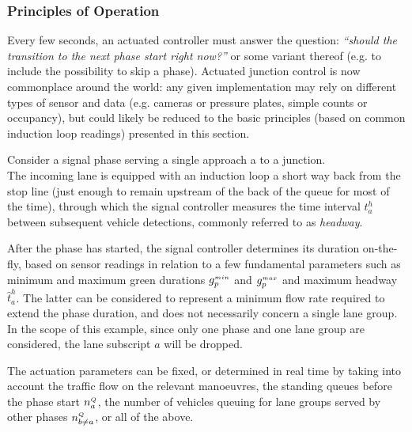 \subsubsection*{Principles of Operation}
Every few seconds, an actuated controller must answer the question: \textit{“should the
transition to the next phase start right now?”} or some variant thereof (e.g. to include the
possibility to skip a phase). Actuated junction control is now commonplace around the world:
any given implementation may rely on different types of sensor and data (e.g. cameras or
pressure plates, simple counts or occupancy), but could likely be reduced to the basic
principles (based on common induction loop readings) presented in this section.

Consider a signal phase serving a single approach a to a junction.\\
The incoming lane is equipped with an induction loop a short way back from the stop line
(just enough to remain upstream of the back of the queue for most of the time), through which
the signal controller measures the time interval $t_a^h$ between subsequent vehicle detections,
commonly referred to as \emph{headway}.

After the phase has started, the signal controller determines its duration on-the-fly, based
on sensor readings in relation to a few fundamental parameters such as minimum and
maximum green durations $g_{p}^{\scriptscriptstyle{min}}$ and $g_{p}^{\scriptscriptstyle{max}}$ and maximum headway $\hat{t}_a^h$. The latter can be considered to represent a minimum flow rate required to extend the phase duration, and does not necessarily concern a single lane group.
In the scope of this example, since only one phase and one lane group are considered, the lane subscript $a$ will be dropped.

The actuation parameters can be fixed, or determined in real time by taking into account the traffic flow on the relevant manoeuvres, the standing queues before the phase start $n_{a}^{\scriptscriptstyle{Q}}$, the number of vehicles queuing for lane groups served by other phases $n_{b \neq a}^{\scriptscriptstyle{Q}}$, or all of the above.

